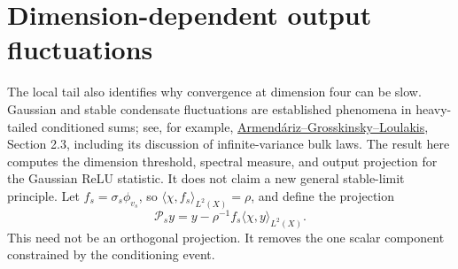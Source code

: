 \section{Dimension-dependent output fluctuations}
The local tail also identifies why convergence at dimension four can be
slow. Gaussian and stable condensate fluctuations are established
phenomena in heavy-tailed conditioned sums; see, for example,
\href{https://arxiv.org/abs/0912.1793}{Armend\'ariz--Grosskinsky--Loulakis},
Section 2.3, including its discussion of infinite-variance bulk laws.
The result here computes the dimension threshold, spectral measure, and
output projection for the Gaussian ReLU statistic. It does not claim
a new general stable-limit principle. Let $f_s=\sigma_s\phi_{v_s}$, so
$\langle\chi,f_s\rangle_{L^2(X)}=\rho$, and define the projection
\[
 \mathcal P_s y=y-\rho^{-1}f_s\langle\chi,y\rangle_{L^2(X)}.
\]
This need not be an orthogonal projection. It removes the one scalar
component constrained by the conditioning event.

